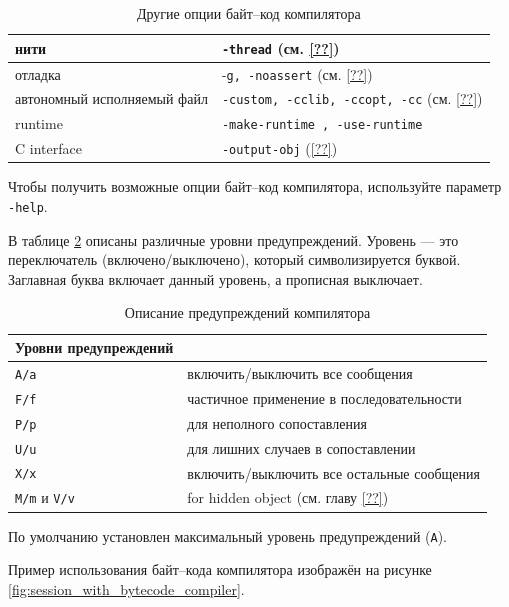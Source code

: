 \begin{table}
	\begin{tabular}{|l|l|}
	\hline
	нити & \texttt{-thread} (см. \ref{??}) \\
	\hline
	отладка & -\texttt{g, -noassert} (см. \ref{??}) \\
	\hline
	автономный исполняемый файл & \texttt{-custom, -cclib, -ccopt, -cc} (см.
\ref{??}) \\
	\hline
	runtime & \texttt{-make-runtime , -use-runtime} \\
	\hline
	C interface & \texttt{-output-obj} (\ref{??}) \\
	\hline
	\end{tabular}
	\caption{\label{tbl:other_options_for_the_bytecode_compiler}Другие опции
байт--код компилятора}
\end{table}

Чтобы получить возможные опции байт--код компилятора, используйте параметр
\texttt{-help}.

В таблице \ref{tbl:description_of_compilation_warnings} описаны различные уровни
предупреждений. Уровень --- это переключатель (включено/выключено), который
символизируется буквой. Заглавная буква включает данный уровень, а прописная
выключает.

\begin{table}
	\begin{tabular}{|l|l|}
	\hline
	Уровни предупреждений & \\
	\hline
	\texttt{A/a} & включить/выключить все сообщения \\
	\hline
	\texttt{F/f} & частичное применение в последовательности \\
	\hline
	\texttt{P/p} & для неполного сопоставления \\
	\hline
	\texttt{U/u} & для лишних случаев в сопоставлении \\
	\hline
	\texttt{X/x} & включить/выключить все остальные сообщения \\
	\hline
	\texttt{M/m} и \texttt{V/v} & for hidden object (см. главу \ref{??}) \\
	\hline
	\end{tabular}
	\caption{\label{tbl:description_of_compilation_warnings}Описание
предупреждений компилятора}
\end{table}

По умолчанию установлен максимальный уровень предупреждений (\texttt{A}).

Пример использования байт--кода компилятора изображён на рисунке
\ref{fig:session_with_bytecode_compiler}.

